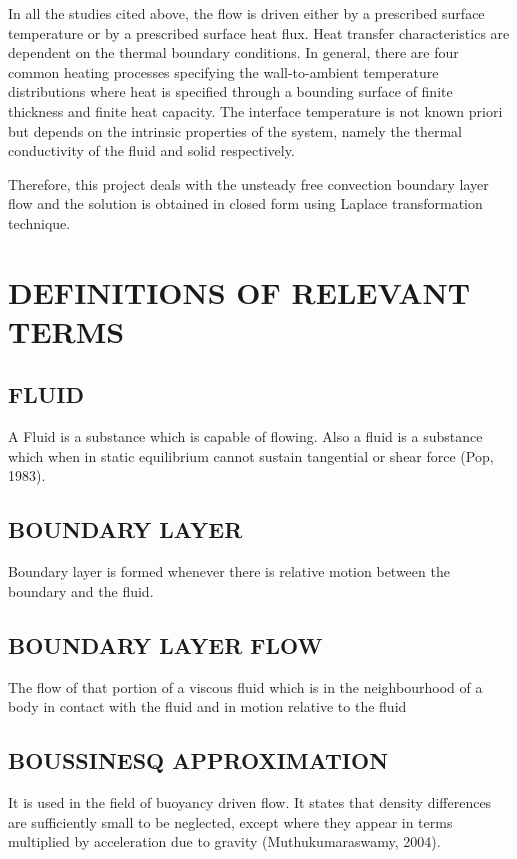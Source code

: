 \documentclass[11pt]{report}
\begin{document}
	In all the studies cited above, the flow is driven either by a prescribed surface temperature or by a prescribed surface heat flux. Heat transfer characteristics are dependent on the thermal boundary conditions. In general, there are four common heating processes specifying the wall-to-ambient temperature distributions where heat is specified through a bounding surface of finite thickness and finite heat capacity. The interface temperature is not known priori but depends on the intrinsic properties of the system, namely the thermal conductivity of the fluid and solid respectively.
	
	Therefore, this project deals with the unsteady free convection boundary layer flow and the solution is obtained in closed form using Laplace transformation technique.
	
	
	\section{DEFINITIONS OF RELEVANT TERMS}
	
	\subsection{FLUID}
	A Fluid is a substance which is capable of flowing. Also a fluid is a substance which when in static equilibrium cannot sustain tangential or shear force (Pop, 1983).
	
	\subsection{BOUNDARY LAYER}
	Boundary layer is formed whenever there is relative motion between the boundary and the fluid.
	
	\subsection{BOUNDARY LAYER FLOW}
	The flow of that portion of a viscous fluid which is in the neighbourhood of a body in contact with the fluid and in motion relative to the fluid
	
	\subsection{BOUSSINESQ APPROXIMATION}
	It is used in the field of buoyancy driven flow. It states that density differences are sufficiently small to be neglected, except where they appear in terms multiplied by acceleration due to gravity (Muthukumaraswamy, 2004).
	
\end{document}
